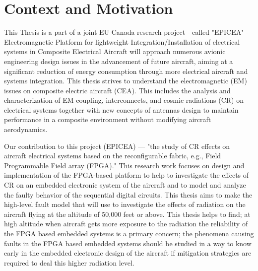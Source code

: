 


\section{Context and Motivation}

This Thesis is a part of a joint EU-Canada research project -  called "EPICEA" - Electromagnetic Platform for
lightweight Integration/Installation of electrical systems in Composite Electrical Aircraft will approach
numerous avionic engineering design issues in the advancement of future aircraft, aiming at a significant
reduction of energy consumption through more electrical aircraft and systems integration. This thesis strives to understand the electromagnetic (EM) issues on composite electric aircraft (CEA). This includes the analysis
and characterization of EM coupling, interconnects, and cosmic radiations (CR) on electrical systems together
with new concepts of antennas design to maintain performance in a composite environment without modifying
aircraft aerodynamics.

Our contribution to this project (EPICEA) --- "the study of CR effects on aircraft electrical systems based on the reconfigurable fabric, e.g., Field Programmable Field array (FPGA)." This research work focuses on design and implementation of the FPGA-based platform to help to investigate the effects of CR on an embedded electronic system of the aircraft and to model and analyze the faulty behavior of the sequential digital circuits. This thesis aims to make the high-level fault model that will use to investigate the effects of radiation on the aircraft flying at the altitude of 50,000 feet or above. This thesis helps to find; at high altitude when aircraft gets more exposure to the radiation the reliability of the FPGA based embedded systems is a primary concern; the phenomena causing faults in the FPGA based embedded systems should be studied in a way to know early in the embedded electronic design of the aircraft if mitigation strategies are required to deal this higher radiation level. 

